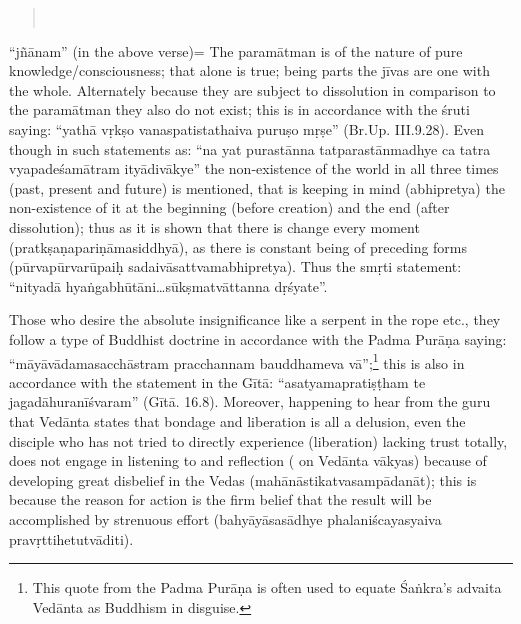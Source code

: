 \begin{verse}
\\
\end{verse}

“jñānam” (in the above verse)= The paramātman is of the nature of pure knowledge/consciousness; that alone is true; being parts the jīvas are one with the whole. Alternately because they are subject to dissolution in comparison to the paramātman they also do not exist; this is in accordance with the śruti saying: “yathā vṛkṣo vanaspatistathaiva puruṣo mṛṣe” (Br.Up. III.9.28). Even though in such statements as: ``na yat purastānna tatparastānmadhye ca tatra vyapadeśamātram ityādivākye'' the non-existence of the world in all three times (past, present and future) is mentioned, that is keeping in mind (abhipretya) the non-existence of it at the beginning (before creation) and the end (after dissolution); thus as it is shown that there is change every moment (pratkṣaṇapariṇāmasiddhyā),  as there is constant being of  preceding forms (pūrvapūrvarūpaiḥ sadaivāsattvamabhipretya). Thus the smṛti statement: “nityadā hyaṅgabhūtāni…sūkṣmatvāttanna dṛśyate”.

\vskip 2pt

Those who desire the absolute insignificance like a serpent in the rope etc., they follow a type of Buddhist doctrine in accordance with the Padma Purāṇa saying: “māyāvādamasacchāstram pracchannam bauddhameva vā”;\footnote{This quote from the Padma Purāṇa is often used to equate Śaṅkra’s advaita Vedānta as Buddhism in disguise.} this is also in accordance with the statement in the Gītā: “asatyamapratiṣṭham te jagadāhuranīśvaram” (Gītā. 16.8). Moreover, happening to hear from the guru that Vedānta states that bondage and liberation is all a delusion, even the disciple who has not tried to directly experience (liberation) lacking trust totally, does not  engage in listening to and reflection ( on Vedānta vākyas) because of developing great disbelief in the Vedas (mahānāstikatvasampādanāt); this is because the reason for action is the firm belief that the result will be accomplished by strenuous effort (bahyāyāsasādhye phalaniścayasyaiva pravṛttihetutvāditi).

